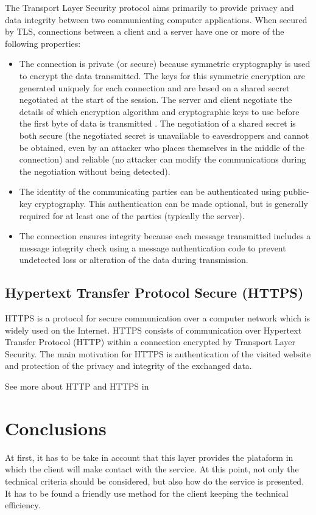 The Transport Layer Security protocol aims primarily to provide privacy and data integrity between two communicating computer applications. When secured by TLS, connections between a client  and a server have one or more of the following properties:
\begin{itemize}
\item The connection is private (or secure) because symmetric cryptography is used to encrypt the data transmitted. The keys for this symmetric encryption are generated uniquely for each connection and are based on a shared secret negotiated at the start of the session. The server and client negotiate the details of which encryption algorithm and cryptographic keys to use before the first byte of data is transmitted . The negotiation of a shared secret is both secure (the negotiated secret is unavailable to eavesdroppers and cannot be obtained, even by an attacker who places themselves in the middle of the connection) and reliable (no attacker can modify the communications during the negotiation without being detected).
\item The identity of the communicating parties can be authenticated using public-key cryptography. This authentication can be made optional, but is generally required for at least one of the parties (typically the server).
\item The connection ensures integrity because each message transmitted includes a message integrity check using a message authentication code to prevent undetected loss or alteration of the data during transmission.
\end{itemize}

\subsection{Hypertext Transfer Protocol Secure (HTTPS)}
HTTPS is a protocol for secure communication over a computer network which is widely used on the Internet. HTTPS consists of communication over Hypertext Transfer Protocol (HTTP) within a connection encrypted by Transport Layer Security. The main motivation for HTTPS is authentication of the visited website and protection of the privacy and integrity of the exchanged data.

See more about HTTP and HTTPS in \cite{HTTPS}

\section{Conclusions} 
At first, it has to be take in account that this layer provides the plataform in which the client will make contact with the service. At this point, not only the technical criteria should be considered, but also how do the service is presented. It has to be found a friendly use method for the client keeping the technical efficiency.

